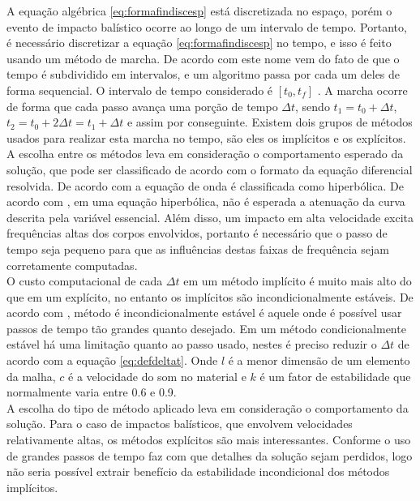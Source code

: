 A equação algébrica \ref{eq:formafindiscesp} está discretizada no espaço, porém o evento de impacto balístico ocorre ao longo de um intervalo de tempo. Portanto, é necessário discretizar a equação \ref{eq:formafindiscesp} no tempo, e isso é feito usando um método de marcha. De acordo com \cite{Paulo} este nome vem do fato de que o tempo é subdividido em intervalos, e um algoritmo passa por cada um deles de forma sequencial. O intervalo de tempo considerado é $[t_0,t_f] $ . A marcha ocorre de forma que cada passo avança uma porção de tempo $ \Delta t $, sendo $ t_1 = t_0 + \Delta t $, $ t_2 = t_0 + 2 \Delta t = t_1 + \Delta t $ e assim por conseguinte. Existem dois grupos de métodos usados para realizar esta marcha no tempo, são eles os implícitos e os explícitos. \\

A escolha entre os métodos leva em consideração o comportamento esperado da solução, que pode ser classificado de acordo com o formato da equação diferencial resolvida. De acordo com \cite{hiermaier_2008} a equação de onda é classificada como hiperbólica. De acordo com \cite{BangerthHartmannKanschat2007}, em uma equação hiperbólica, não é esperada a atenuação da curva descrita pela variável essencial. Além disso, um impacto em alta velocidade excita frequências altas dos corpos envolvidos, portanto é necessário que o passo de tempo seja pequeno para que as influências destas faixas de frequência sejam corretamente computadas. \\

O custo computacional de cada $\Delta t$ em um método implícito é muito mais alto do que em um explícito, no entanto os implícitos são incondicionalmente estáveis. De acordo com \cite{Paulo}, método é incondicionalmente estável é aquele onde é possível usar passos de tempo tão grandes quanto desejado. Em um método condicionalmente estável há uma limitação quanto ao passo usado, nestes é preciso reduzir o $ \Delta t $ de acordo com a equação \ref{eq:defdeltat}. Onde $l$ é a menor dimensão de um elemento da malha, $c$ é a velocidade do som no material e $k$ é um fator de estabilidade que normalmente varia entre 0.6 e 0.9. \\

A escolha do tipo de método aplicado leva em consideração o comportamento da solução. Para o caso de impactos balísticos, que envolvem velocidades relativamente altas, os métodos explícitos são mais interessantes. Conforme \cite{Zukas} o uso de grandes passos de tempo faz com que detalhes da solução sejam perdidos, logo não seria possível extrair benefício da estabilidade incondicional dos métodos implícitos.\\

